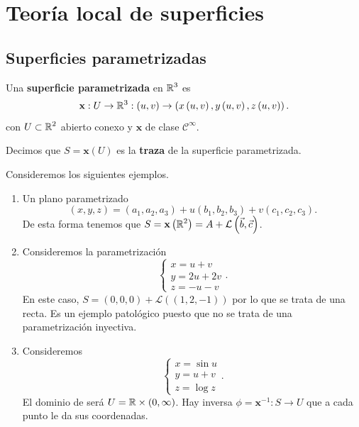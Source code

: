 \chapter{Teoría local de superficies}
\section{Superficies parametrizadas}
\begin{definition}
	Una \textbf{superficie parametrizada} en $\displaystyle \mathbb{R}^{3} $ es  
	\[\textbf{x} : U \to \mathbb{R}^{3} : \left(u,v\right)\to \left(x\left(u,v\right), y\left(u,v\right), z\left(u,v\right)\right) .\]
	con $\displaystyle U\subset \mathbb{R}^{2} $ abierto conexo y $\displaystyle \textbf{x} $ de clase $\displaystyle \mathcal{C}^{\infty } $. 
\end{definition}
\begin{definition}[Traza]
Decimos que $\displaystyle S = \textbf{x} \left(U\right) $ es la \textbf{traza} de la superficie parametrizada.
\end{definition}
\begin{eg} Consideremos los siguientes ejemplos.
	\begin{enumerate}
	\item Un plano parametrizado 
		\[\left(x,y,z\right)=\left(a_{1}, a_{2}, a_{3}\right) + u\left(b_{1}, b_{2}, b_{3}\right)+ v\left(c_{1}, c_{2}, c_{3}\right) .\]
	De esta forma tenemos que $\displaystyle S = \textbf{x} \left(\mathbb{R}^{2}\right)=A + \mathcal{L}\left(\vec{b}, \vec{c}\right) $. 	
\item Consideremos la parametrización 
	\[
	\begin{cases}
	x = u + v \\
	y = 2u + 2v \\
	z = - u - v
	\end{cases}
	.\]
	En este caso, $\displaystyle S = \left(0,0,0\right) + \mathcal{L}\left(\left(1,2,-1\right)\right) $ por lo que se trata de una recta. Es un ejemplo patológico puesto que no se trata de una parametrización inyectiva. 
\item Consideremos 
	\[
	\begin{cases}
	x = \sin u \\
	y = u + v \\
	z = \log z
	\end{cases}
	.\]
	El dominio de será $\displaystyle U = \mathbb{R} \times \left(0, \infty\right) $. Hay inversa $\displaystyle \phi= \textbf{x} ^{-1} : S \to U $ que a cada punto le da sus coordenadas. 
	\end{enumerate}
\end{eg}
